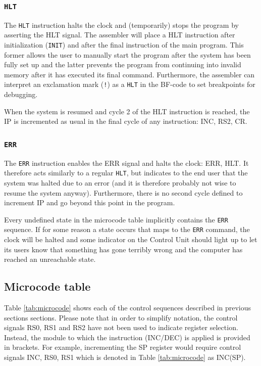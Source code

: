 \documentclass{article}
\begin{document}
\subsubsection{\texttt{HLT}}
The \texttt{HLT} instruction halts the clock and (temporarily) stops the program by asserting the HLT signal. The assembler will place a HLT instruction after initialization (\texttt{INIT}) and after the final instruction of the main program. This former allows the user to manually start the program after the system has been fully set up and the latter prevents the program from continuing into invalid memory after it has executed its final command. Furthermore, the assembler can interpret an exclamation mark (\texttt{!}) as a \texttt{HLT} in the BF-code to set breakpoints for debugging.

When the system is resumed and cycle 2 of the HLT instruction is reached, the IP is incremented as usual in the final cycle of any instruction: INC, RS2, CR.

\subsubsection{\texttt{ERR}}
The \texttt{ERR} instruction enables the ERR signal and halts the clock: ERR, HLT. It therefore acts similarly to a regular \texttt{HLT}, but indicates to the end user that the system was halted due to an error (and it is therefore probably not wise to resume the system anyway). Furthermore, there is no second cycle defined to increment IP and go beyond this point in the program.

Every undefined state in the microcode table implicitly contains the \texttt{ERR} sequence. If for some reason a state occurs that maps to the \texttt{ERR} command, the clock will be halted and some indicator on the Control Unit should light up to let its users know that something has gone terribly wrong and the computer has reached an unreachable state.

\subsection{Microcode table}
Table \ref{tab:microcode} shows each of the control sequences described in previous sections sections. Please note that in order to simplify notation, the control signals RS0, RS1 and RS2 have not been used to indicate register selection. Instead, the module to which the instruction (INC/DEC) is applied is provided in brackets. For example, incrementing the SP register would require control signals INC, RS0, RS1 which is denoted in Table \ref{tab:microcode} as INC(SP).
\newpage

\end{document}
